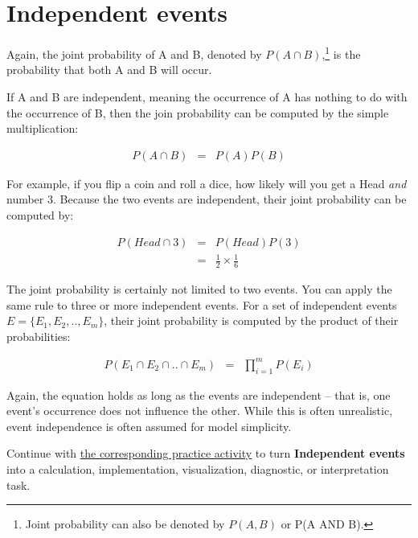 \documentclass[
  letterpaper,
]{scrbook}
\begin{document}
\section{Independent events}\label{independent-events}

Again, the joint probability of A and B, denoted by
\(P(A \cap B)\),\footnote{Joint probability can also be denoted by
  \(P(A, B)\) or P(A AND B).} is the probability that both A and B will
occur.

If A and B are independent, meaning the occurrence of A has nothing to
do with the occurrence of B, then the join probability can be computed
by the simple multiplication:

\[\begin{aligned}
P(A \cap B) & = & P(A) P(B)
\end{aligned}\]

For example, if you flip a coin and roll a dice, how likely will you get
a Head \emph{and} number \(3\). Because the two events are independent,
their joint probability can be computed by:

\[\begin{aligned}
P(Head \cap 3)  & = & P(Head) P(3) \\
                & = & \frac{1}{2} \times \frac{1}{6}
\end{aligned}\]

The joint probability is certainly not limited to two events. You can
apply the same rule to three or more independent events. For a set of
independent events \(E = \{E_1, E_2, .., E_m\}\), their joint
probability is computed by the product of their probabilities:

\[\begin{aligned}
P(E_1 \cap E_2 \cap .. \cap E_m)
& = & \prod_{i=1}^{m} P(E_i)
\end{aligned}\]

Again, the equation holds as long as the events are independent -- that
is, one event's occurrence does not influence the other. While this is
often unrealistic, event independence is often assumed for model
simplicity.

\begin{tcolorbox}[enhanced jigsaw, arc=.35mm, bottomrule=.15mm, bottomtitle=1mm, breakable, colback=white, colbacktitle=quarto-callout-tip-color!10!white, colframe=quarto-callout-tip-color-frame, coltitle=black, left=2mm, leftrule=.75mm, opacityback=0, opacitybacktitle=0.6, rightrule=.15mm, title=\textcolor{quarto-callout-tip-color}{\faLightbulb}\hspace{0.5em}{Put it into practice}, titlerule=0mm, toprule=.15mm, toptitle=1mm]

Continue with \hyperref[sec-pr-04-independent-events]{the corresponding
practice activity} to turn \textbf{Independent events} into a
calculation, implementation, visualization, diagnostic, or
interpretation task.

\end{tcolorbox}
\end{document}

